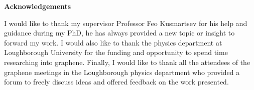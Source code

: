 %
\thispagestyle{plain}
\begin{center}
	\Large
	\textbf{Acknowledgements}
\end{center}
	I would like to thank my supervisor Professor Feo Kusmartsev for his help and guidance during my PhD, he has always provided a new topic or insight to forward my work. I would also like to thank the physics department at Loughborough University for the funding and opportunity to spend time researching into graphene. Finally, I would like to thank all the attendees of the graphene meetings in the Loughborough physics department who provided a forum to freely discuss ideas and offered feedback on the work presented.
%

